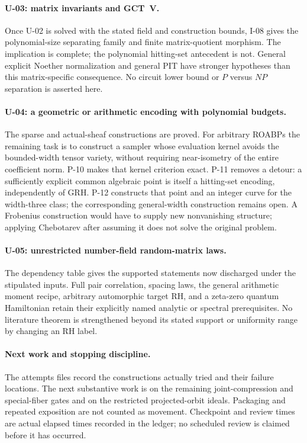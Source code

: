 \documentclass[11pt,a4paper]{article}
\theoremstyle{definition}\newtheorem{definition}{Definition}
\begin{document}
\paragraph{U-03: matrix invariants and GCT~V.}
Once U-02 is solved with the stated field and construction bounds, I-08 gives the polynomial-size separating family and finite matrix-quotient morphism. The implication is complete; the polynomial hitting-set antecedent is not. General explicit Noether normalization and general PIT have stronger hypotheses than this matrix-specific consequence. No circuit lower bound or $P$ versus $NP$ separation is asserted here.

\paragraph{U-04: a geometric or arithmetic encoding with polynomial budgets.}
The sparse and actual-sheaf constructions are proved. For arbitrary ROABPs the remaining task is to construct a sampler whose evaluation kernel avoids the bounded-width tensor variety, without requiring near-isometry of the entire coefficient norm. P-10 makes that kernel criterion exact. P-11 removes a detour: a sufficiently explicit common algebraic point is itself a hitting-set encoding, independently of GRH. P-12 constructs that point and an integer curve for the width-three class; the corresponding general-width construction remains open. A Frobenius construction would have to supply new nonvanishing structure; applying Chebotarev after assuming it does not solve the original problem.

\paragraph{U-05: unrestricted number-field random-matrix laws.}
The dependency table gives the supported statements now discharged under the stipulated inputs. Full pair correlation, spacing laws, the general arithmetic moment recipe, arbitrary automorphic target RH, and a zeta-zero quantum Hamiltonian retain their explicitly named analytic or spectral prerequisites. No literature theorem is strengthened beyond its stated support or uniformity range by changing an RH label.

\paragraph{Next work and stopping discipline.}
The attempts files record the constructions actually tried and their failure locations. The next substantive work is on the remaining joint-compression and special-fiber gates and on the restricted projected-orbit ideals. Packaging and repeated exposition are not counted as movement. Checkpoint and review times are actual elapsed times recorded in the ledger; no scheduled review is claimed before it has occurred.
\end{document}
